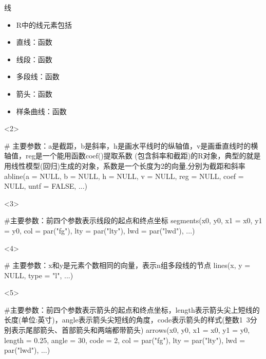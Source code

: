 \documentclass{beamerthemeMono}
\begin{document}
\begin{frame}[t,fragile]{\subsecname}{线}
\begin{itemize}
\item<1-> R中的线元素包括
\item<2-> 直线：函数
\item<3-> 线段：函数
\item<4-> 多段线：函数
\item<5-> 箭头：函数
\item<6-> 样条曲线：函数
\end{itemize}

\begin{onlyenv}<2>
\begin{rcode}
# 主要参数：a是截距，b是斜率，h是画水平线时的纵轴值，v是画垂直线时的横轴值，reg是一个能用函数coef()提取系数
(包含斜率和截距)的R对象，典型的就是用线性模型(回归)生成的对象，系数是一个长度为2的向量,分别为截距和斜率
abline(a = NULL, b = NULL, h = NULL, v = NULL, reg = NULL, coef = NULL, untf = FALSE, ...)
\end{rcode}
\end{onlyenv}  

\begin{onlyenv}<3>
\begin{rcode}
#主要参数：前四个参数表示线段的起点和终点坐标
segments(x0, y0, x1 = x0, y1 = y0, col = par("fg"), lty = par("lty"), lwd = par("lwd"), ...)
\end{rcode}
\end{onlyenv} 

\begin{onlyenv}<4>
\begin{rcode}
# 主要参数：x和y是元素个数相同的向量，表示n组多段线的节点
lines(x, y = NULL, type = "l", ...)
\end{rcode}
\end{onlyenv} 

\begin{onlyenv}<5>
\begin{rcode}
#主要参数：前四个参数表示箭头的起点和终点坐标，length表示箭头尖上短线的长度(单位:英寸)，angle表示箭头尖短线的角度，code表示箭头的样式(整数1~3分别表示尾部箭头、首部箭头和两端都带箭头)
arrows(x0, y0, x1 = x0, y1 = y0, length = 0.25, angle = 30, code = 2, col = par("fg"), lty = par("lty"), lwd = par("lwd"), ...)
\end{rcode}
\end{onlyenv} 


\end{frame}
\end{document}
